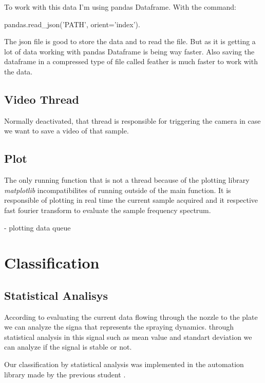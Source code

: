         To work with this data I'm using pandas Dataframe.
        With the command:
        
        pandas.read\_json('PATH', orient='index').
    
        The json file is good to store the data and to read the file. But as it is getting a lot of data working with pandas Dataframe is being way faster. Also saving the dataframe in a compressed
        type of file called feather is much faster to work with the data.
    
    \subsection{Video Thread}

        Normally deactivated, that thread is responsible for triggering the camera in case we want to save a video of that sample.
    
    \subsection{Plot}

        The only running function that is not a thread because of the plotting library \emph{matplotlib} incompatibilites of running outside of the main function. 
        It is responsible of plotting in real time the current sample acquired and it respective fast fourier transform to evaluate the sample frequency spectrum.



    
    
    - plotting data queue


\section{Classification}
\label{sec:section_classification}

\subsection{Statistical Analisys}

 According to \cite{Sjaaks} evaluating the current data flowing through the nozzle to the plate we can analyze the signa that represents the spraying dynamics.
 through statistical analysis in this signal such as mean value and standart deviation we can analyze if the signal is stable or not.

 Our classification by statistical analysis was implemented in the automation library made by the previous student \cite{Monica}.

